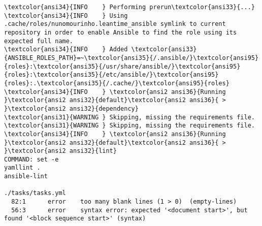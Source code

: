 \documentclass{scrartcl}
\begin{document}
\begin{Verbatim}
\textcolor{ansi34}{INFO    } Performing prerun\textcolor{ansi33}{...}
\textcolor{ansi34}{INFO    } Using .cache/roles/nunomourinho.leantime_ansible symlink to current repository in order to enable Ansible to find the role using its expected full name.
\textcolor{ansi34}{INFO    } Added \textcolor{ansi33}{ANSIBLE_ROLES_PATH}=~\textcolor{ansi35}{/.ansible/}\textcolor{ansi95}{roles}:\textcolor{ansi35}{/usr/share/ansible/}\textcolor{ansi95}{roles}:\textcolor{ansi35}{/etc/ansible/}\textcolor{ansi95}{roles}:.\textcolor{ansi35}{/.cache/}\textcolor{ansi95}{roles}
\textcolor{ansi34}{INFO    } \textcolor{ansi2 ansi36}{Running }\textcolor{ansi2 ansi32}{default}\textcolor{ansi2 ansi36}{ > }\textcolor{ansi2 ansi32}{dependency}
\textcolor{ansi31}{WARNING } Skipping, missing the requirements file.
\textcolor{ansi31}{WARNING } Skipping, missing the requirements file.
\textcolor{ansi34}{INFO    } \textcolor{ansi2 ansi36}{Running }\textcolor{ansi2 ansi32}{default}\textcolor{ansi2 ansi36}{ > }\textcolor{ansi2 ansi32}{lint}
COMMAND: set -e
yamllint .
ansible-lint

./tasks/tasks.yml
  82:1      error    too many blank lines (1 > 0)  (empty-lines)
  56:3      error    syntax error: expected '<document start>', but found '<block sequence start>' (syntax)


\end{Verbatim}
\end{document}
